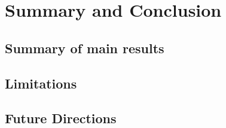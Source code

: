\chapter{Summary and Conclusion}

\section{Summary of main results}

\section{Limitations}

\section{Future Directions}